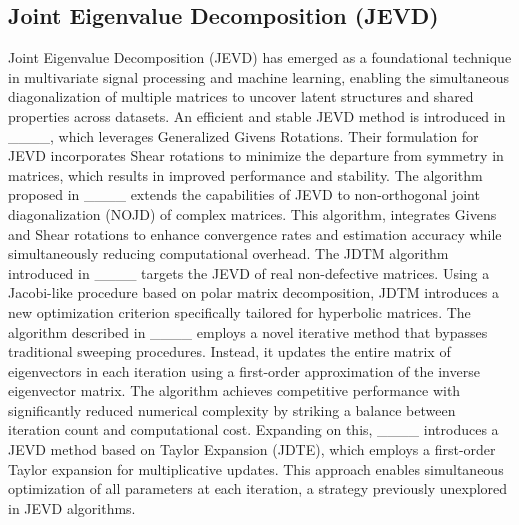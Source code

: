 \subsection{Joint Eigenvalue Decomposition (JEVD)}
Joint Eigenvalue Decomposition (JEVD) has emerged as a foundational technique in multivariate signal processing and machine learning, enabling the simultaneous diagonalization of multiple matrices to uncover latent structures and shared properties across datasets. %
An efficient and stable JEVD method is introduced in ____, which leverages Generalized Givens Rotations. Their formulation for JEVD incorporates Shear rotations to minimize the departure from symmetry in matrices, which results in improved performance and stability. %
The algorithm proposed in ____ extends the capabilities of JEVD to non-orthogonal joint diagonalization (NOJD) of complex matrices. This algorithm, %
integrates Givens and Shear rotations to enhance convergence rates and estimation accuracy while simultaneously reducing computational overhead. %
The JDTM algorithm introduced in ____ targets the JEVD of real non-defective matrices. Using a Jacobi-like procedure based on polar matrix decomposition, JDTM introduces a new optimization criterion specifically tailored for hyperbolic matrices. %
The algorithm described in ____ employs a novel iterative method that bypasses traditional sweeping procedures. Instead, it updates the entire matrix of eigenvectors in each iteration using a first-order approximation of the inverse eigenvector matrix. The algorithm achieves competitive performance with significantly reduced numerical complexity by striking a balance between iteration count and computational cost. Expanding on this, ____ introduces a JEVD method based on Taylor Expansion (JDTE), which employs a first-order Taylor expansion for multiplicative updates. This approach enables simultaneous optimization of all parameters at each iteration, a strategy previously unexplored in JEVD algorithms. %

